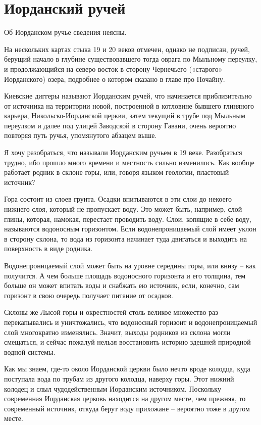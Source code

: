 \chapter {Иорданский ручей}

Об Иорданском ручье сведения неясны. 

На нескольких картах стыка 19 и 20 веков отмечен, однако не подписан, ручей, берущий начало в глубине существовавшего тогда оврага по Мыльному переулку, и продолжающийся на северо-восток в сторону Чернечьего («старого» Иорданского) озера, подробнее о котором сказано в главе про Почайну.

Киевские диггеры называют Иорданским ручей, что начинается приблизительно от источника на территории новой, построенной в котловине бывшего глиняного карьера, Никольско-Иорданской церкви, затем текущий в трубе под Мыльным переулком и далее под улицей Заводской в сторону Гавани, очень вероятно повторяя путь ручья, упомянутого абзацем выше.

Я хочу разобраться, что называли Иорданским ручьем в 19 веке. Разобраться трудно, ибо прошло много времени и местность сильно изменилось. Как вообще работает родник в склоне горы, или, говоря языком геологии, пластовый источник? 

Гора состоит из слоев грунта. Осадки впитываются в эти слои до некоего нижнего слоя, который не пропускает воду. Это может быть, например, слой глины, которая, намокая, перестает проводить воду. Слои, копящие в себе воду, называются водоносным горизонтом. Если водонепроницаемый слой имеет уклон в сторону склона, то вода из горизонта начинает туда двигаться и выходить на поверхность в виде родника.

Водонепроницаемый слой может быть на уровне середины горы, или внизу – как получится. А чем больше площадь водоносного горизонта и его толщина, тем больше он может впитать воды и снабжать ею источник, если, конечно, сам горизонт в свою очередь получает питание от осадков.

Склоны же Лысой горы и окрестностей столь великое множество раз перекапывались и уничтожались, что водоносный горизонт и водонепроницаемый слой многократно изменялись. Значит, выходы родников из склона могли смещаться, и сейчас пожалуй нельзя восстановить историю здешней природной водной системы.
 
Как мы знаем, где-то около Иорданской церкви было нечто вроде колодца, куда поступала вода по трубам из другого колодца, наверху горы. Этот нижний колодец и слыл чудодейственным Иорданским источником. Поскольку современная Иорданская церковь находится на другом месте, чем прежняя, то современный источник, откуда берут воду прихожане – вероятно тоже в другом месте.

